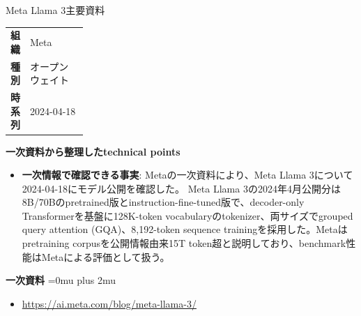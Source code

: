 \Needspace{0.38\textheight}
\begin{technicalnote}{Meta Llama 3}{主要資料}
\begingroup
\begin{tabularx}{\linewidth}{@{}>{\bfseries}p{0.22\linewidth}X@{}}
組織 & Meta \\
種別 & オープンウェイト \\
時系列 & 2024-04-18 \\
\end{tabularx}
\smallskip
\begin{minipage}{\linewidth}
{\bfseries 一次資料から整理したtechnical points}
\begin{itemize}[leftmargin=1.5em,itemsep=0.35em]
\item \textbf{一次情報で確認できる事実}: Metaの一次資料により、Meta Llama 3について2024-04-18にモデル公開を確認した。 Meta Llama 3の2024年4月公開分は8B/70Bのpretrained版とinstruction-fine-tuned版で、decoder-only Transformerを基盤に128K-token vocabularyのtokenizer、両サイズでgrouped query attention (GQA)、8,192-token sequence trainingを採用した。Metaはpretraining corpusを公開情報由来15T token超と説明しており、benchmark性能はMetaによる評価として扱う。
\end{itemize}
\begin{minipage}{\linewidth}
\begin{samepage}
{\bfseries 一次資料}
\begingroup\sloppy
\Urlmuskip=0mu plus 2mu\relax
\begin{itemize}[leftmargin=1.5em,itemsep=0.25em]
\item {\scriptsize\url{https://ai.meta.com/blog/meta-llama-3/}}
\end{itemize}
\endgroup
\end{samepage}
\end{minipage}
\end{minipage}
\endgroup
\end{technicalnote}
\medskip

